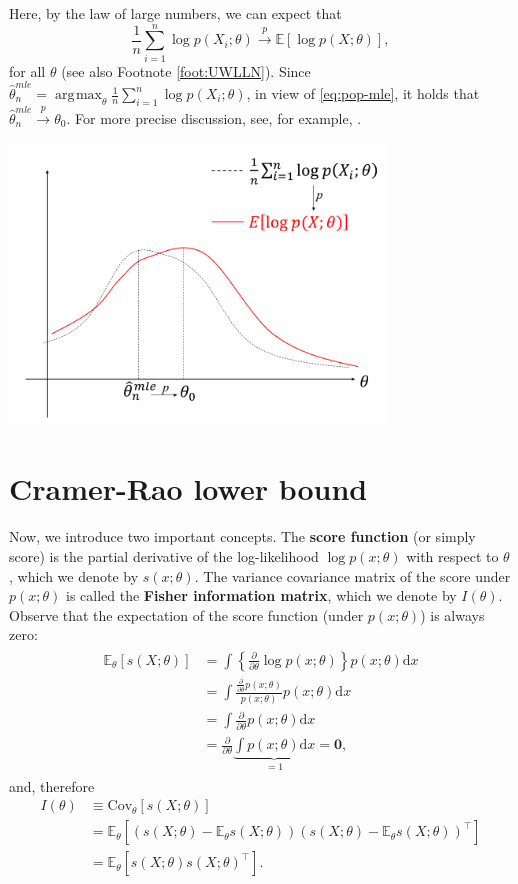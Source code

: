 \documentclass[10.5pt, A4paper, openany, uplatex]{book}
\newcommand{\mbf}{\mathbf}
\newcommand{\mrm}{\mathrm}
\newcommand{\E}{\mathbb{E}}
\newcommand{\Cov}{\mathrm{Cov}}
\renewcommand{\hat}{\widehat}
\numberwithin{equation}{section}
\DeclareMathOperator*{\argmax}{\arg\!\max}
\begin{document}
Here, by the law of large numbers, we can expect that
\[
	\frac{1}{n}\sum_{i=1}^n \log p(X_i; \theta) \overset{p}{\to}  \E[\log p(X; \theta) ],
\]
for all $\theta$ (see also Footnote \ref{foot:UWLLN}).
Since $\hat{\theta}_n^{mle} = \argmax_{\theta}\frac{1}{n}\sum_{i=1}^n \log p(X_i; \theta)$, in view of \eqref{eq:pop-mle}, it holds that  $\hat{\theta}_n^{mle} \overset{p}{\to} \theta_0$.
For more precise discussion, see, for example, \cite{newey1994large}.
\begin{center}
	\includegraphics[width=10cm]{mle.png}
\end{center}

\section{Cramer-Rao lower bound}\label{sec:CRLB}
Now, we introduce two important concepts.
The \textbf{score function} (or simply score) is the partial derivative of the log-likelihood $\log p(x; \theta)$ with respect to $\theta$, which we denote by $s(x; \theta)$.
The variance covariance matrix of the score under $p(x; \theta)$ is called the \textbf{Fisher information matrix}, which we denote by $I(\theta)$.
Observe that the expectation of the score function (under $p(x; \theta)$) is always zero:
\begin{align}\label{eq:scorezero}
\begin{split}
	\E_\theta[s(X; \theta)]
	& = \int \left\{\frac{\partial}{\partial \theta}\log p(x; \theta)\right\} p(x; \theta) \mrm{d}x \\
	& =  \int \frac{\frac{\partial}{\partial \theta} p(x; \theta)}{p(x; \theta)}p(x; \theta) \mrm{d}x \\
	& = \int \frac{\partial}{\partial \theta} p(x; \theta)  \mrm{d}x \\
	& = \frac{\partial}{\partial \theta} \underbrace{\int p(x; \theta) \mrm{d}x}_{=1} = \mbf{0},
\end{split}
\end{align}
and, therefore
\begin{align*}
	I(\theta) 
	& \equiv \Cov_{\theta}\left[ s(X; \theta) \right] \\
	& = \E_\theta \left[ ( s(X; \theta) - \E_\theta s(X; \theta) ) ( s(X; \theta) - \E_\theta s(X; \theta) )^\top \right] \\
	& = \E_\theta\left[ s(X; \theta) s(X; \theta)^\top \right].
\end{align*}
\bigskip
\end{document}
